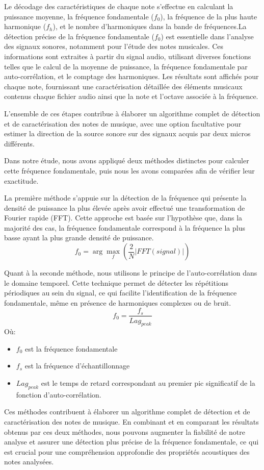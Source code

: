 Le décodage des caractéristiques de chaque note s'effectue en calculant la puissance moyenne, la fréquence fondamentale ($f_0$), la fréquence de la plus haute harmonique ($f_h$), et le nombre d'harmoniques dans la bande de fréquences.La détection précise de la fréquence fondamentale ($f_0$) est essentielle dans l'analyse des signaux sonores, notamment pour l'étude des notes musicales. Ces informations sont extraites à partir du signal audio, utilisant diverses fonctions telles que le calcul de la moyenne de puissance, la fréquence fondamentale par auto-corrélation, et le comptage des harmoniques. Les résultats sont affichés pour chaque note, fournissant une caractérisation détaillée des éléments musicaux contenus chaque fichier audio ainsi que la note et l'octave associée à la fréquence. 

L'ensemble de ces étapes contribue à élaborer un algorithme complet de détection et de caractérisation des notes de musique, avec une option facultative pour estimer la direction de la source sonore sur des signaux acquis par deux micros différents. 

Dans notre étude, nous avons appliqué deux méthodes distinctes pour calculer cette fréquence fondamentale, puis nous les avons comparées afin de vérifier leur exactitude.

La première méthode s'appuie sur la détection de la fréquence qui présente la densité de puissance la plus élevée après avoir effectué une transformation de Fourier rapide (FFT). Cette approche est basée sur l'hypothèse que, dans la majorité des cas, la fréquence fondamentale correspond à la fréquence la plus basse ayant la plus grande densité de puissance.
\begin{equation}
    f_0 = \arg\max_f(\frac{2}{N}|FFT(signal)|)
\end{equation}

Quant à la seconde méthode, nous utilisons le principe de l'auto-corrélation dans le domaine temporel. Cette technique permet de détecter les répétitions périodiques au sein du signal, ce qui facilite l'identification de la fréquence fondamentale, même en présence de harmoniques complexes ou de bruit.
\begin{equation}
    f_0 = \frac{f_s}{Lag_{peak}}
\end{equation}
Où: 
\begin{itemize}
    \item $f_0$ est la fréquence fondamentale  
    \item $f_s$ est la fréquence d'échantillonnage 
    \item $Lag_{peak}$ est le temps de retard correspondant au premier pic significatif de la fonction d'auto-corrélation.
\end{itemize}

Ces méthodes contribuent à élaborer un algorithme complet de détection et de caractérisation des notes de musique. En combinant et en comparant les résultats obtenus par ces deux méthodes, nous pouvons augmenter la fiabilité de notre analyse et assurer une détection plus précise de la fréquence fondamentale, ce qui est crucial pour une compréhension approfondie des propriétés acoustiques des notes analysées.
